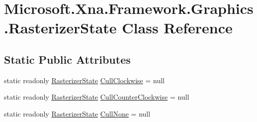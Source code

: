 \hypertarget{class_microsoft_1_1_xna_1_1_framework_1_1_graphics_1_1_rasterizer_state}{}\section{Microsoft.\+Xna.\+Framework.\+Graphics.\+Rasterizer\+State Class Reference}
\label{class_microsoft_1_1_xna_1_1_framework_1_1_graphics_1_1_rasterizer_state}
\subsection*{Static Public Attributes}
\begin{DoxyCompactItemize}
\item 
static readonly \hyperlink{class_microsoft_1_1_xna_1_1_framework_1_1_graphics_1_1_rasterizer_state}{Rasterizer\+State} \hyperlink{class_microsoft_1_1_xna_1_1_framework_1_1_graphics_1_1_rasterizer_state_aaaa680de38a8d4c73da5c31630e1b6cb}{Cull\+Clockwise} = null
\item 
static readonly \hyperlink{class_microsoft_1_1_xna_1_1_framework_1_1_graphics_1_1_rasterizer_state}{Rasterizer\+State} \hyperlink{class_microsoft_1_1_xna_1_1_framework_1_1_graphics_1_1_rasterizer_state_a605e87c372be04b52360832e75b4fcd3}{Cull\+Counter\+Clockwise} = null
\item 
static readonly \hyperlink{class_microsoft_1_1_xna_1_1_framework_1_1_graphics_1_1_rasterizer_state}{Rasterizer\+State} \hyperlink{class_microsoft_1_1_xna_1_1_framework_1_1_graphics_1_1_rasterizer_state_a6d9f2e8b3fbc9ef4f09cc8cfcd05acd0}{Cull\+None} = null
\end{DoxyCompactItemize}
